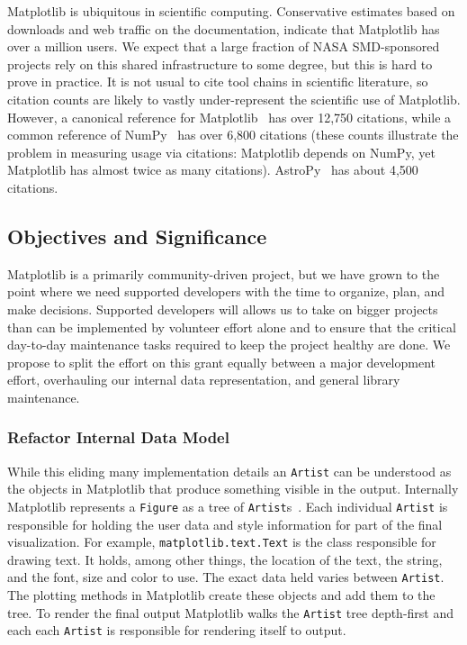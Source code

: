 \documentclass[12pt]{article}
\numberwithin{page}{section}
\begin{document}
Matplotlib is ubiquitous in scientific computing.  Conservative estimates based on downloads and web traffic on the documentation, indicate that Matplotlib has over a
million users.  We expect that a large fraction of NASA SMD-sponsored
projects rely on this shared infrastructure to some degree, but this
is hard to prove in practice.  It is not usual to cite tool chains in scientific literature, so citation counts are likely to
vastly under-represent the scientific use of Matplotlib.  However, a
canonical reference for Matplotlib~\cite{Hunter:2007} has over 12,750
citations, while a common reference of NumPy~\cite{walt2011numpy} has
over 6,800 citations (these counts illustrate the problem in
measuring usage via citations: Matplotlib depends on
NumPy, yet Matplotlib has almost twice as many citations).  
AstroPy~\cite{robitaille2013astropy} has about 4,500 citations.  

\subsection{Objectives and Significance}





Matplotlib is a primarily community-driven project, but we have grown
to the point where we need supported developers with the time to
organize, plan, and make decisions.  Supported developers will allows
us to take on bigger projects than can be implemented by volunteer
effort alone and to ensure that the critical day-to-day maintenance
tasks required to keep the project healthy are done.  We propose to
split the effort on this grant equally between a major development
effort, overhauling our internal data representation, and general
library maintenance.


\subsubsection{Refactor Internal Data Model}

While this eliding many implementation details an \texttt{Artist} can
be understood as the objects in Matplotlib that produce something
visible in the output.  Internally Matplotlib represents a
\texttt{Figure} as a tree of \texttt{Artist}s~\cite{AOSA_mpl}.  Each
individual \texttt{Artist} is responsible for holding the user data
and style information for part of the final visualization.  For
example, \texttt{matplotlib.text.Text} is the class responsible for
drawing text.  It holds, among other things, the location of the text,
the string, and the font, size and color to use.  The exact data held
varies between \texttt{Artist}.  The plotting methods in Matplotlib
create these objects and add them to the tree.  To render the final
output Matplotlib walks the \texttt{Artist} tree depth-first and each
each \texttt{Artist} is responsible for rendering itself to output.
\end{document}
